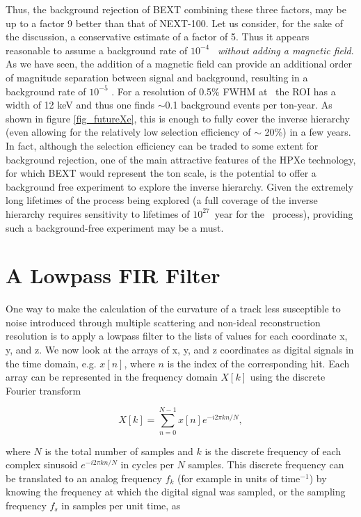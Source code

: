 \documentclass{JINST}
\begin{document}
Thus, the background rejection of BEXT combining these three factors, may be up to a factor 9 better than that of NEXT-100. Let us consider, for the sake of the discussion, a conservative estimate of a factor of 5. Thus it appears reasonable to assume a background rate of $10^{-4}$ \ckky\ {\em without adding a magnetic field}. As we have seen, the addition of a magnetic field can provide an additional order of magnitude separation between signal and background, resulting in a background rate of $10^{-5}$ \ckky.  For a resolution of 0.5\% FWHM at \Qbb\ the ROI has a width of 12 keV and thus one finds $\sim$0.1 background events per ton-year. As shown in figure \ref{fig_futureXe}, this is enough to fully cover the inverse hierarchy (even allowing for the relatively low selection efficiency of $\sim$ 20\%) in a few years. In fact, although the selection efficiency can be traded to some extent for background rejection, one of the main attractive features of the HPXe technology, for which BEXT would represent the ton scale, is the potential to offer a  background free experiment to explore the inverse hierarchy. Given the extremely long lifetimes of the process being explored (a full coverage of the inverse hierarchy requires sensitivity to lifetimes of $10^{27}$~year for the \bbonu\ process), providing such a background-free experiment may be a must. 

\appendix

\section{A Lowpass FIR Filter}\label{app:FIR}

One way to make the calculation of the curvature of a track less susceptible to noise 
introduced through multiple scattering and non-ideal reconstruction resolution is to apply a lowpass filter to 
the lists of values for each coordinate x, y, and z.  We now look at the arrays of x, y, and z coordinates as digital 
signals in the time domain, e.g. $x[n]$, where $n$ is the index of the corresponding hit.  Each array can be 
represented in the frequency domain $X[k]$ using the discrete Fourier transform

\begin{equation}
X[k] = \sum_{n=0}^{N-1}x[n]e^{-i2\pi kn/N},
\end{equation}

\noindent where $N$ is the total number of samples and $k$ is the discrete frequency of each complex
sinusoid $e^{-i2\pi kn/N}$ in cycles per $N$ samples.  This discrete frequency can be translated to an analog
frequency $f_{k}$ (for example in units of time$^{-1}$) by knowing the frequency at which the digital signal was
sampled, or the sampling frequency $f_{s}$ in samples per unit time, as
\end{document}
